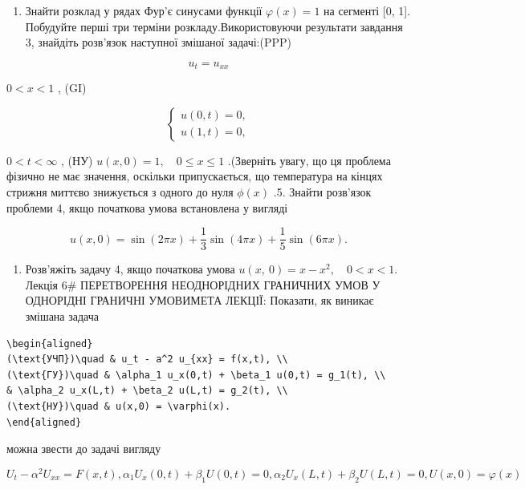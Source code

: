 \documentclass[
  ukrainian,
]{article}
\providecommand{\tightlist}{%
  \setlength{\itemsep}{0pt}\setlength{\parskip}{0pt}}
\begin{document}
\begin{enumerate}
\def\labelenumi{\arabic{enumi}.}
\setcounter{enumi}{2}
\tightlist
\item
  Знайти розклад у рядах Фур'є синусами функції \(\varphi(x) = 1\) на
  сегменті {[}0, 1{]}. Побудуйте перші три терміни
  розкладу.Використовуючи результати завдання 3, знайдіть розв'язок
  наступної змішаної задачі:(PPP)
\end{enumerate}

\[
u_t = u_{xx}
\]

\(0 < x < 1\) , (GI)

\[
\begin{cases} u(0, t) = 0, \\ u(1, t) = 0, \end{cases}
\]

\(0 < t < \infty\) , (НУ) \(u(x, 0) = 1, \quad 0 \le x \le 1\)
.(Зверніть увагу, що ця проблема фізично не має значення, оскільки
припускається, що температура на кінцях стрижня миттєво знижується з
одного до нуля \(\phi(x)\) .5. Знайти розв'язок проблеми 4, якщо
початкова умова встановлена у вигляді

\[
u(x, 0) = \sin(2\pi x) + \frac{1}{3}\sin(4\pi x) + \frac{1}{5}\sin(6\pi x).
\]

\begin{enumerate}
\def\labelenumi{\arabic{enumi}.}
\setcounter{enumi}{5}
\tightlist
\item
  Розв'яжіть задачу 4, якщо початкова умова
  \(u\left( x,\ 0\right) =x-x^{2},\quad 0< x<1.\) Лекція 6\#
  ПЕРЕТВОРЕННЯ НЕОДНОРІДНИХ ГРАНИЧНИХ УМОВ У ОДНОРІДНІ ГРАНИЧНІ
  УМОВИМЕТА ЛЕКЦІЇ: Показати, як виникає змішана задача
\end{enumerate}

\begin{verbatim}
\begin{aligned}
(\text{УЧП})\quad & u_t - a^2 u_{xx} = f(x,t), \\
(\text{ГУ})\quad & \alpha_1 u_x(0,t) + \beta_1 u(0,t) = g_1(t), \\
& \alpha_2 u_x(L,t) + \beta_2 u(L,t) = g_2(t), \\
(\text{НУ})\quad & u(x,0) = \varphi(x).
\end{aligned}
\end{verbatim}

можна звести до задачі вигляду

\[
U_{t} - \alpha^{2}U_{xx} = F(x, t),
\alpha_{1}U_{x}(0, t) + \beta_{1}U(0, t) = 0,
\alpha_{2}U_{x}(L, t) + \beta_{2}U(L, t) = 0,
U(x, 0) = \varphi(x)
\]
\end{document}
